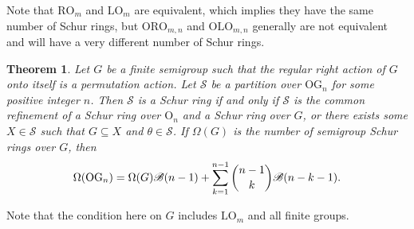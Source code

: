 \documentclass{article}
\theoremstyle{plain}
\newtheorem{Thm}{Theorem}[section]
\theoremstyle{definition}
\renewcommand{\S}{\mathcal{S}}
\newcommand{\B}{\mathscr{B}}
\renewcommand{\O}{\mathrm{O}}
\newcommand{\LO}{\mathrm{LO}}
\newcommand{\RO}{\mathrm{RO}}
\newcommand{\ORO}{\mathrm{ORO}}
\newcommand{\OLO}{\mathrm{OLO}}
\newcommand{\OG}{\mathrm{OG}}
\begin{document}
Note that $\RO_m$ and $\LO_m$ are equivalent, which implies they have the same number of Schur rings, but $\ORO_{m,n}$ and \label{olo}$\OLO_{m,n}$ generally are not equivalent and will have a very different number of Schur rings. 

\begin{Thm}\label{thm:og} Let $G$ be a finite semigroup such that the regular right action of $G$ onto itself is a permutation action. Let $\S$ be a partition over $\OG_n$ for some positive integer $n$. Then $\S$ is a Schur ring if and only if $\S$ is the common refinement of a Schur ring over $\O_n$ and a Schur ring over $G$, or there exists some $X\in \S$ such that $G\subseteq X$ and $\theta\in \S$. If $\label{omega}\Omega(G)$ is the number of semigroup Schur rings over $G$, then \[\Omega(\OG_n) = \Omega(G)\B(n-1) + \sum_{k=1}^{n-1} \dbinom{n-1}{k}\B(n-k-1).\]
\end{Thm}
Note that the condition here on $G$ includes $\LO_m$ and all finite groups.
\end{document}
